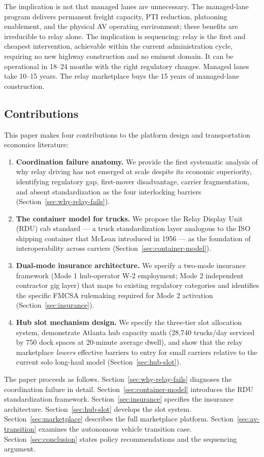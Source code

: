 The implication is not that managed lanes are unnecessary. The managed-lane program \citep{ROUTE_E2} delivers permanent freight capacity, PTI reduction, platooning enablement, and the physical AV operating environment; these benefits are irreducible to relay alone. The implication is sequencing: relay is the first and cheapest intervention, achievable within the current administration cycle, requiring no new highway construction and no eminent domain. It can be operational in 18--24 months with the right regulatory changes. Managed lanes take 10--15 years. The relay marketplace buys the 15 years of managed-lane construction.

\subsection*{Contributions}

This paper makes four contributions to the platform design and transportation economics literature:

\begin{enumerate}
  \item \textbf{Coordination failure anatomy.} We provide the first systematic analysis of why relay driving has not emerged at scale despite its economic superiority, identifying regulatory gap, first-mover disadvantage, carrier fragmentation, and absent standardization as the four interlocking barriers (Section~\ref{sec:why-relay-fails}).

  \item \textbf{The container model for trucks.} We propose the Relay Display Unit (RDU) cab standard --- a truck standardization layer analogous to the ISO shipping container that McLean \citep{McLean1956} introduced in 1956 --- as the foundation of interoperability across carriers (Section~\ref{sec:container-model}).

  \item \textbf{Dual-mode insurance architecture.} We specify a two-mode insurance framework (Mode 1 hub-operator W-2 employment; Mode 2 independent contractor gig layer) that maps to existing regulatory categories and identifies the specific FMCSA rulemaking required for Mode 2 activation (Section~\ref{sec:insurance}).

  \item \textbf{Hub slot mechanism design.} We specify the three-tier slot allocation system, demonstrate Atlanta hub capacity math (28,740 trucks/day serviced by 750 dock spaces at 20-minute average dwell), and show that the relay marketplace \textit{lowers} effective barriers to entry for small carriers relative to the current solo long-haul model (Section~\ref{sec:hub-slot}).
\end{enumerate}

The paper proceeds as follows. Section~\ref{sec:why-relay-fails} diagnoses the coordination failure in detail. Section~\ref{sec:container-model} introduces the RDU standardization framework. Section~\ref{sec:insurance} specifies the insurance architecture. Section~\ref{sec:hub-slot} develops the slot system. Section~\ref{sec:marketplace} describes the full marketplace platform. Section~\ref{sec:av-transition} examines the autonomous vehicle transition case. Section~\ref{sec:conclusion} states policy recommendations and the sequencing argument.
